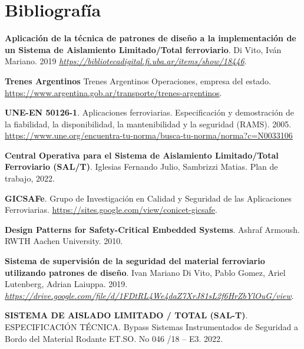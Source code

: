 
\section{Bibliografía}



 \begin{thebibliography}{30}


 \textbf{Aplicación de la técnica de patrones de diseño a la implementación de un Sistema de Aislamiento Limitado/Total ferroviario}. Di Vito, Iván Mariano. 2019 \href{https://bibliotecadigital.fi.uba.ar/items/show/18446}{\textit{https://bibliotecadigital.fi.uba.ar/items/show/18446}}.

 \textbf{Trenes Argentinos} Trenes Argentinos Operaciones, empresa del estado. \href{https://www.argentina.gob.ar/transporte/trenes-argentinos}{https://www.argentina.gob.ar/transporte/trenes-argentinos}.
 
\textbf{UNE-EN 50126-1}. Aplicaciones ferroviarias. Especificación y demostración de la fiabilidad, la disponibilidad, la mantenibilidad y la seguridad (RAMS). 2005. \href{https://www.une.org/encuentra-tu-norma/busca-tu-norma/norma?c=N0033106}{https://www.une.org/encuentra-tu-norma/busca-tu-norma/norma?c=N0033106}

 \textbf{Central Operativa para el Sistema de Aislamiento Limitado/Total Ferroviario (SAL/T)}. Iglesias Fernando Julio, Sambrizzi Matias. Plan de trabajo, 2022. 

 \textbf{GICSAFe}. Grupo de Investigación en Calidad y Seguridad de las Aplicaciones Ferroviarias. \href{https://sites.google.com/view/conicet-gicsafe}{https://sites.google.com/view/conicet-gicsafe}.

 \textbf{Design Patterns for Safety-Critical Embedded Systems}. Ashraf Armoush. RWTH Aachen University. 2010.

 \textbf{Sistema de supervisión de la seguridad del material ferroviario utilizando patrones de diseño}. Ivan Mariano Di Vito, Pablo Gomez, Ariel Lutenberg, Adrian Laiuppa. 2019. \href{https://drive.google.com/file/d/1FDtRL4We4daZ7XrJ81sL2f6HrZbYlOuG/view}{\textit{https://drive.google.com/file/d/1FDtRL4We4daZ7XrJ81sL2f6HrZbYlOuG/view}}. 

  
 \textbf{SISTEMA DE AISLADO LIMITADO / TOTAL (SAL-T)}. ESPECIFICACIÓN TÉCNICA. Bypass Sistemas Instrumentados de Seguridad a Bordo del Material Rodante ET.SO. No 046 /18 – E3. 2022.



\end{thebibliography}

